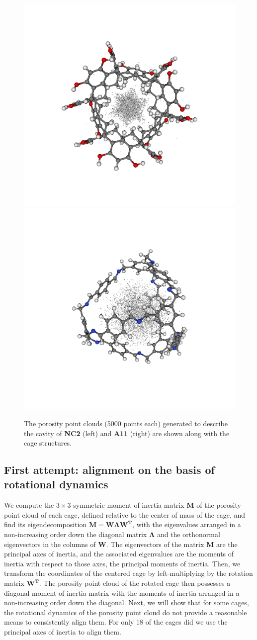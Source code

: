 \documentclass[journal=jacsat,manuscript=article]{achemso}
\begin{document}
\begin{figure}
\centering
	\includegraphics[width=0.45\columnwidth]{NC2_porosity_point_cloud.png}
	\includegraphics[width=0.45\columnwidth]{A11_porosity_point_cloud.png}
	\caption{The porosity point clouds (5000 points each) generated to describe the cavity of \textbf{NC2} (left) and \textbf{A11} (right) are shown along with the cage structures.
	} \label{fig:porosity_pt_cloud}
\end{figure}

\subsection{First attempt: alignment on the basis of rotational dynamics}
\label{sec:alignment_details}
We compute the $3\times 3$ symmetric moment of inertia matrix $\mathbf{M}$ of the porosity point cloud of each cage, defined relative to the center of mass of the cage, and find its eigendecomposition $\mathbf{M}=\mathbf{W}\mathbf{\Lambda}\mathbf{W^T}$, with the eigenvalues arranged in a non-increasing order down the diagonal matrix $\mathbf{\Lambda}$ and the orthonormal eigenvectors in the columns of $\mathbf{W}$. The eigenvectors of the matrix $\mathbf{M}$ are the principal axes of inertia, and the associated eigenvalues are the moments of inertia with respect to those axes, the principal moments of inertia. Then, we transform the coordinates of the centered cage by left-multiplying by the rotation matrix $\mathbf{W^T}$. The porosity point cloud of the rotated cage then possesses a diagonal moment of inertia matrix with the moments of inertia arranged in a non-increasing order down the diagonal. Next, we will show that for some cages, the rotational dynamics of the porosity point cloud do not provide a reasonable means to consistently align them. For only 18 of the cages did we use the principal axes of inertia to align them.
\end{document}
